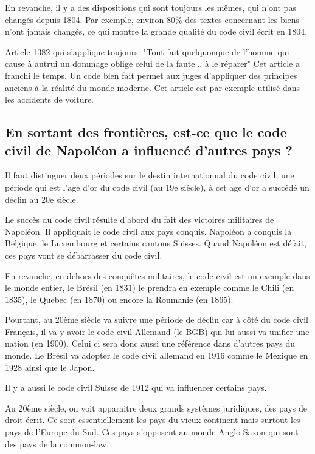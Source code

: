 \documentclass[12pt, a4paper, openany]{book}
\begin{document}
En revanche, il y a des dispositions qui sont toujours les mêmes, qui n'ont pas changés depuis 1804. Par exemple, environ 80\% des textes concernant les biens n'ont jamais changés, ce qui montre la grande qualité du code civil écrit en 1804.

Article 1382 qui s'applique toujours: "Tout fait quelquonque de l'homme qui cause à autrui un dommage oblige celui de la faute... à le réparer" Cet article a franchi le temps. Un code bien fait permet aux juges d'appliquer des principes anciens à la réalité du monde moderne. Cet article est par exemple utilisé dans les accidents de voiture. 


\subsection{En sortant des frontières, est-ce que le code civil de Napoléon a influencé d'autres pays ?}

Il faut distinguer deux périodes sur le destin internationnal du code civil: une période qui est l'age d'or du code civil (au 19e siècle), à cet age d'or a succédé un déclin au 20e siècle.

Le succès du code civil résulte d'abord du fait des victoires militaires de Napoléon. Il appliquait le code civil aux pays conquis. Napoléon a conquis la Belgique, le Luxembourg et certains cantons Suisses. Quand Napoléon est défait, ces pays vont se débarrasser du code civil. 

En revanche, en dehors des conquêtes militaires, le code civil est un exemple dans le monde entier, le Brésil (en 1831) le prendra en exemple comme le Chili (en 1835), le Quebec (en 1870) ou encore la Roumanie (en 1865).

Pourtant, au 20ème siècle va suivre une période de déclin car à côté du code civil Français, il va y avoir le code civil Allemand (le BGB) qui lui aussi va unifier une nation (en 1900). Celui ci sera donc aussi une référence dans d'autres pays du monde. Le Brésil va adopter le code civil allemand en 1916 comme le Mexique en 1928 ainsi que le Japon.

Il y a aussi le code civil Suisse de 1912 qui va influencer certains pays.

Au 20ème siècle, on voit apparaitre deux grands systèmes juridiques, des pays de droit écrit. Ce sont essentiellement les pays du vieux continent mais surtout les pays de l'Europe du Sud. Ces pays s'opposent au monde Anglo-Saxon qui sont des pays de la common-law. 
\end{document}
